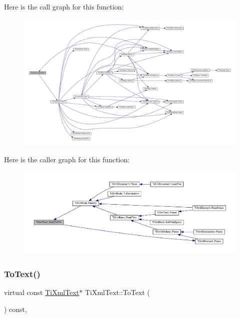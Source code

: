 Here is the call graph for this function\+:\nopagebreak
\begin{figure}[H]
\begin{center}
\leavevmode
\includegraphics[width=350pt]{class_ti_xml_text_acb17ff7c5d09b2c839393445a3de5ea9_cgraph}
\end{center}
\end{figure}
Here is the caller graph for this function\+:\nopagebreak
\begin{figure}[H]
\begin{center}
\leavevmode
\includegraphics[width=350pt]{class_ti_xml_text_acb17ff7c5d09b2c839393445a3de5ea9_icgraph}
\end{center}
\end{figure}
\mbox{\label{class_ti_xml_text_af8973cfd4ca00c5d934cb23e8aa0f5d5}} 
\subsubsection{\texorpdfstring{To\+Text()}{ToText()}\hspace{0.1cm}{\footnotesize\ttfamily [1/2]}}
{\footnotesize\ttfamily virtual const \hyperlink{class_ti_xml_text}{Ti\+Xml\+Text}$\ast$ Ti\+Xml\+Text\+::\+To\+Text (\begin{DoxyParamCaption}{ }\end{DoxyParamCaption}) const\hspace{0.3cm}{\ttfamily [inline]}, {\ttfamily [virtual]}}



